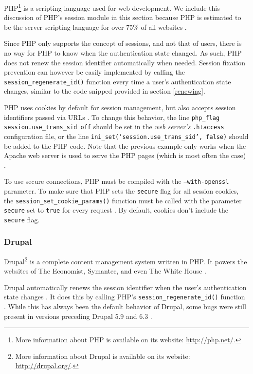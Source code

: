 PHP\footnote{More information about PHP is available on its website: \url{http://php.net/}.} is a scripting language used for web development. We include this discussion of PHP's session module in this section because PHP is estimated to be the server scripting language for over 75\% of all websites \cite{ServerSurvey}.

Since PHP only supports the concept of sessions, and not that of users, there is no way for PHP to know when the authentication state changed. As such, PHP does not renew the session identifier automatically when needed. Session fixation prevention can however be easily implemented by calling the \texttt{session\_regenerate\_id()} function every time a user's authentication state changes, similar to the code snipped provided in section \ref{renewing}.

PHP uses cookies by default for session management, but also accepts session identifiers passed via URLs  \cite{Holovaty2008}. To change this behavior, the line \texttt{php\_flag session.use\_trans\_sid\ off} should be set in the \emph{web server's} \texttt{.htaccess} configuration file, or the line \texttt{ini\_set('session.use\_trans\_sid', false)} should be added to the PHP code. Note that the previous example only works when the Apache web server is used to serve the PHP pages (which is most often the case) \cite{PHPdisableURL}.

To use secure connections, PHP must be compiled with the \texttt{--with-openssl} parameter. To make sure that PHP sets the \texttt{secure} flag for all session cookies, the \texttt{session\_set\_cookie\_params()} function must be called with the parameter \texttt{secure} set to \texttt{true} for every request \cite{PHPsessionCookieParams}. By default, cookies don't include the \texttt{secure} flag.

\subsubsection{Drupal}

Drupal\footnote{More information about Drupal is available on its website: \url{http://drupal.org/}.} is a complete content management system written in PHP. It powers the websites of The Economist, Symantec, and even The White House \cite{DrupalCases,DrupalWhiteHouse}.

Drupal automatically renews the session identifier when the user's authentication state changes \cite{DrupalAuth}. It does this by calling PHP's \texttt{session\_regenerate\_id()} function \cite{DrupalRegenerate}. While this has always been the default behavior of Drupal, some bugs were still present in versions preceding Drupal 5.9 and 6.3 \cite{DrupalBug}.

